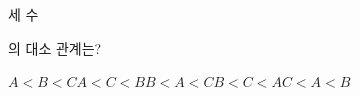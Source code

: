 세 수\par\smallskip{}\par\smallskip\noindent 의 대소 관계는?
\begin{choicesii}{$A<B<C$}{$A<C<B$}{$B<A<C$}{$B<C<A$}{$C<A<B$}\end{choicesii}
